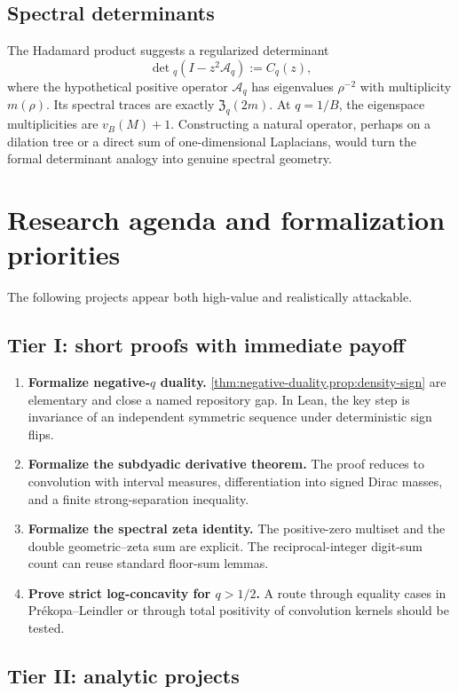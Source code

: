 \documentclass[11pt]{article}
\theoremstyle{definition}
\theoremstyle{remark}
\begin{document}
\subsection{Spectral determinants}

The Hadamard product suggests a regularized determinant
\[
 \det{}_q(I-z^2\mathcal A_q)
 :=C_q(z),
\]
where the hypothetical positive operator $\mathcal A_q$ has eigenvalues $\rho^{-2}$ with multiplicity $m(\rho)$.  Its spectral traces are exactly $\mathfrak Z_q(2m)$.  At $q=1/B$, the eigenspace multiplicities are $v_B(M)+1$.  Constructing a natural operator, perhaps on a dilation tree or a direct sum of one-dimensional Laplacians, would turn the formal determinant analogy into genuine spectral geometry.

\section{Research agenda and formalization priorities}

The following projects appear both high-value and realistically attackable.

\subsection{Tier I: short proofs with immediate payoff}

\begin{enumerate}
  \item \textbf{Formalize negative-$q$ duality.}  \cref{thm:negative-duality,prop:density-sign} are elementary and close a named repository gap.  In Lean, the key step is invariance of an independent symmetric sequence under deterministic sign flips.
  \item \textbf{Formalize the subdyadic derivative theorem.}  The proof reduces to convolution with interval measures, differentiation into signed Dirac masses, and a finite strong-separation inequality.
  \item \textbf{Formalize the spectral zeta identity.}  The positive-zero multiset and the double geometric--zeta sum are explicit.  The reciprocal-integer digit-sum count can reuse standard floor-sum lemmas.
  \item \textbf{Prove strict log-concavity for $q>1/2$.}  A route through equality cases in Pr\'ekopa--Leindler or through total positivity of convolution kernels should be tested.
\end{enumerate}

\subsection{Tier II: analytic projects}
\end{document}
